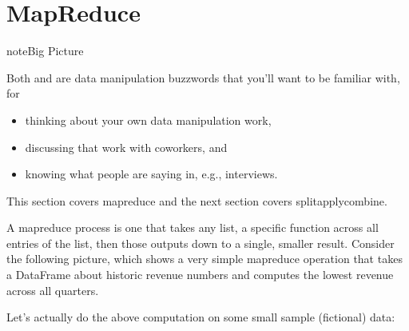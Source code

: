\documentclass[letterpaper,10pt,english]{sphinxmanual}
\begin{document}
\section{Map\sphinxhyphen{}Reduce}
\label{\detokenize{chapter-11-processing-rows:map-reduce}}
\begin{sphinxadmonition}{note}{Big Picture}

Both  and  are data manipulation buzzwords that you’ll want to be familiar with, for
\begin{itemize}
\item {} 
thinking about your own data manipulation work,

\item {} 
discussing that work with coworkers, and

\item {} 
knowing what people are saying in, e.g., interviews.

\end{itemize}

This section covers map\sphinxhyphen{}reduce and the next section covers split\sphinxhyphen{}apply\sphinxhyphen{}combine.
\end{sphinxadmonition}

A map\sphinxhyphen{}reduce process is one that takes any list,  a specific function across all entries of the list, then  those outputs down to a single, smaller result.  Consider the following picture, which shows a very simple map\sphinxhyphen{}reduce operation that takes a DataFrame about historic revenue numbers and computes the lowest revenue across all quarters.


Let’s actually do the above computation on some small sample (fictional) data:
\end{document}
